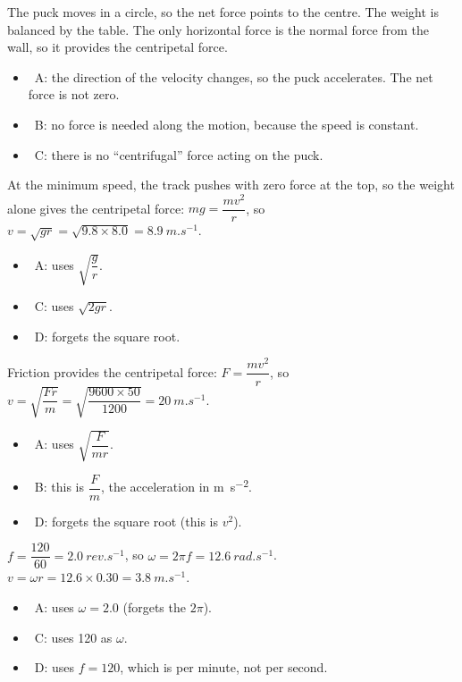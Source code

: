 \documentclass[12pt]{article}
\begin{document}
\begin{practiceanswers}
\begin{practiceans}
  The puck moves in a circle, so the net force points to the centre. The weight is balanced by the
  table. The only horizontal force is the normal force from the wall, so it provides the
  centripetal force.
  \begin{itemize}
    \item \xmark\ A: the direction of the velocity changes, so the puck accelerates. The net force
          is not zero.
    \item \xmark\ B: no force is needed along the motion, because the speed is constant.
    \item \xmark\ C: there is no “centrifugal” force acting on the puck.
  \end{itemize}
\end{practiceans}

\begin{practiceans}
  At the minimum speed, the track pushes with zero force at the top, so the weight alone gives the
  centripetal force: $mg = \dfrac{mv^2}{r}$, so $v = \sqrt{gr} = \sqrt{9.8 \times 8.0} =
  \qty{8.9}{m.s^{-1}}$.
  \begin{itemize}
    \item \xmark\ A: uses $\sqrt{\dfrac{g}{r}}$.
    \item \xmark\ C: uses $\sqrt{2gr}$.
    \item \xmark\ D: forgets the square root.
  \end{itemize}
\end{practiceans}

\begin{practiceans}
  Friction provides the centripetal force: $F = \dfrac{mv^2}{r}$, so
  $v = \sqrt{\dfrac{Fr}{m}} = \sqrt{\dfrac{9600 \times 50}{1200}} = \qty{20}{m.s^{-1}}$.
  \begin{itemize}
    \item \xmark\ A: uses $\sqrt{\dfrac{F}{mr}}$.
    \item \xmark\ B: this is $\dfrac{F}{m}$, the acceleration in \si{m.s^{-2}}.
    \item \xmark\ D: forgets the square root (this is $v^2$).
  \end{itemize}
\end{practiceans}

\begin{practiceans}
  $f = \dfrac{120}{60} = \qty{2.0}{rev.s^{-1}}$, so $\omega = 2\pi f = \qty{12.6}{rad.s^{-1}}$.
  $v = \omega r = 12.6 \times 0.30 = \qty{3.8}{m.s^{-1}}$.
  \begin{itemize}
    \item \xmark\ A: uses $\omega = 2.0$ (forgets the $2\pi$).
    \item \xmark\ C: uses 120 as $\omega$.
    \item \xmark\ D: uses $f = 120$, which is per minute, not per second.
  \end{itemize}
\end{practiceans}


\end{practiceanswers}
\end{document}
